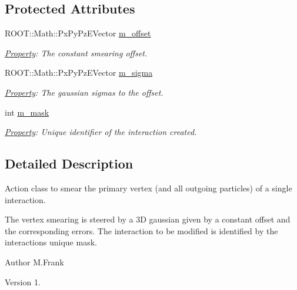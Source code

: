 \subsection*{Protected Attributes}
\begin{DoxyCompactItemize}
\item 
R\+O\+O\+T\+::\+Math\+::\+Px\+Py\+Pz\+E\+Vector \hyperlink{class_d_d4hep_1_1_simulation_1_1_geant4_interaction_vertex_smear_a34e2bcca2e7e15bad2fae703422fa22c}{m\+\_\+offset}
\begin{DoxyCompactList}\small\item\em \hyperlink{class_d_d4hep_1_1_property}{Property}\+: The constant smearing offset. \end{DoxyCompactList}\item 
R\+O\+O\+T\+::\+Math\+::\+Px\+Py\+Pz\+E\+Vector \hyperlink{class_d_d4hep_1_1_simulation_1_1_geant4_interaction_vertex_smear_a407c72b211c3733623129565bcc71e0c}{m\+\_\+sigma}
\begin{DoxyCompactList}\small\item\em \hyperlink{class_d_d4hep_1_1_property}{Property}\+: The gaussian sigmas to the offset. \end{DoxyCompactList}\item 
int \hyperlink{class_d_d4hep_1_1_simulation_1_1_geant4_interaction_vertex_smear_a1862cd4719c77831e20725e7228bd6f1}{m\+\_\+mask}
\begin{DoxyCompactList}\small\item\em \hyperlink{class_d_d4hep_1_1_property}{Property}\+: Unique identifier of the interaction created. \end{DoxyCompactList}\end{DoxyCompactItemize}


\subsection{Detailed Description}
Action class to smear the primary vertex (and all outgoing particles) of a single interaction. 

The vertex smearing is steered by a 3D gaussian given by a constant offset and the corresponding errors. The interaction to be modified is identified by the interaction\textquotesingle{}s unique mask.

\begin{DoxyAuthor}{Author}
M.\+Frank 
\end{DoxyAuthor}
\begin{DoxyVersion}{Version}
1. 
\end{DoxyVersion}


